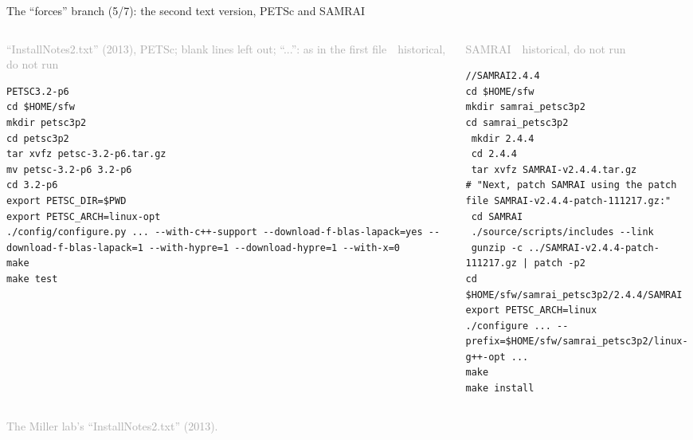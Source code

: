 \documentclass[aspectratio=169,11pt]{beamer}
\newcommand{\sourcecredit}[1]{\vfill\begin{flushright}\tiny\textcolor{DarkGray}{#1}\end{flushright}}
\newcommand{\hist}[1]{{\tiny\sffamily\textcolor{DarkGray}{#1\ \textbullet\ historical, do not run}}\par\nointerlineskip\vspace{0.3mm}}
\begin{document}
\begin{frame}[fragile]{The ``forces'' branch (5/7): the second text version, PETSc and SAMRAI}
\label{fr:forces4}
\begin{columns}[T,onlytextwidth]
\begin{column}{0.49\textwidth}
\hist{``InstallNotes2.txt'' (2013), PETSc; blank lines left out; ``...'': as in the first file}
\begin{lstlisting}[style=hist]
PETSC3.2-p6
cd $HOME/sfw
mkdir petsc3p2
cd petsc3p2
tar xvfz petsc-3.2-p6.tar.gz
mv petsc-3.2-p6 3.2-p6
cd 3.2-p6
export PETSC_DIR=$PWD
export PETSC_ARCH=linux-opt
./config/configure.py ... --with-c++-support --download-f-blas-lapack=yes --download-f-blas-lapack=1 --with-hypre=1 --download-hypre=1 --with-x=0
make
make test
\end{lstlisting}
\end{column}
\begin{column}{0.48\textwidth}
\hist{SAMRAI}
\begin{lstlisting}[style=hist]
//SAMRAI2.4.4
cd $HOME/sfw
mkdir samrai_petsc3p2
cd samrai_petsc3p2
 mkdir 2.4.4
 cd 2.4.4
 tar xvfz SAMRAI-v2.4.4.tar.gz
# "Next, patch SAMRAI using the patch file SAMRAI-v2.4.4-patch-111217.gz:"
 cd SAMRAI
 ./source/scripts/includes --link
 gunzip -c ../SAMRAI-v2.4.4-patch-111217.gz | patch -p2
cd $HOME/sfw/samrai_petsc3p2/2.4.4/SAMRAI
export PETSC_ARCH=linux
./configure ... --prefix=$HOME/sfw/samrai_petsc3p2/linux-g++-opt ...
make
make install
\end{lstlisting}
\end{column}
\end{columns}
\sourcecredit{The Miller lab's ``InstallNotes2.txt'' (2013).}
\end{frame}
\end{document}
